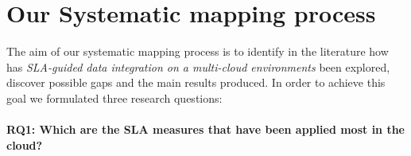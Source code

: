 \section{Our Systematic mapping process}\label{sec:sm}


 



The aim of our systematic mapping process is to identify in the literature how has \textit{SLA-guided
data integration on a multi-cloud environments} been explored, discover possible
gaps and the main results produced.    
In order to achieve this goal we formulated three research questions:
\paragraph{\textbf{RQ1:} Which are the SLA measures that have been applied most in
the cloud?} 
